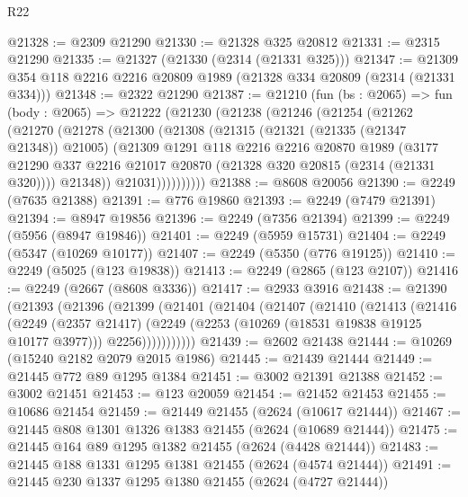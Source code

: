 \begin{lexlean}{R22}
\begin{coremodule}
@21328 := @2309 @21290
@21330 := @21328 @325 @20812
@21331 := @2315 @21290
@21335 := @21327 (@21330 (@2314 (@21331 @325)))
@21347 := @21309 @354 @118 @2216 @2216 @20809 @1989 (@21328 @334 @20809 (@2314 (@21331 @334)))
@21348 := @2322 @21290
@21387 := @21210
    (fun (bs : @2065) =>
    fun (body : @2065) =>
    @21222
      (@21230
        (@21238
          (@21246
            (@21254
              (@21262
                (@21270
                  (@21278
                    (@21300
                      (@21308
                        (@21315
                          (@21321 (@21335 (@21347 @21348)) @21005)
                          (@21309
                            @1291
                            @118
                            @2216
                            @2216
                            @20870
                            @1989
                            (@3177
                              @21290
                              @337
                              @2216
                              @21017
                              @20870
                              (@21328 @320 @20815 (@2314 (@21331 @320))))
                            @21348))
                        @21031))))))))))
@21388 := @8608 @20056
@21390 := @2249 (@7635 @21388)
@21391 := @776 @19860
@21393 := @2249 (@7479 @21391)
@21394 := @8947 @19856
@21396 := @2249 (@7356 @21394)
@21399 := @2249 (@5956 (@8947 @19846))
@21401 := @2249 (@5959 @15731)
@21404 := @2249 (@5347 (@10269 @10177))
@21407 := @2249 (@5350 (@776 @19125))
@21410 := @2249 (@5025 (@123 @19838))
@21413 := @2249 (@2865 (@123 @2107))
@21416 := @2249 (@2667 (@8608 @3336))
@21417 := @2933 @3916
@21438 := @21390
    (@21393
      (@21396
        (@21399
          (@21401
            (@21404
              (@21407
                (@21410
                  (@21413
                    (@21416
                      (@2249
                        (@2357 @21417)
                        (@2249 (@2253 (@10269 (@18531 @19838 @19125 @10177 @3977))) @2256)))))))))))
@21439 := @2602 @21438
@21444 := @10269 (@15240 @2182 @2079 @2015 @1986)
@21445 := @21439 @21444
@21449 := @21445 @772 @89 @1295 @1384
@21451 := @3002 @21391 @21388
@21452 := @3002 @21451
@21453 := @123 @20059
@21454 := @21452 @21453
@21455 := @10686 @21454
@21459 := @21449 @21455 (@2624 (@10617 @21444))
@21467 := @21445 @808 @1301 @1326 @1383 @21455 (@2624 (@10689 @21444))
@21475 := @21445 @164 @89 @1295 @1382 @21455 (@2624 (@4428 @21444))
@21483 := @21445 @188 @1331 @1295 @1381 @21455 (@2624 (@4574 @21444))
@21491 := @21445 @230 @1337 @1295 @1380 @21455 (@2624 (@4727 @21444))

\end{coremodule}
\end{lexlean}
